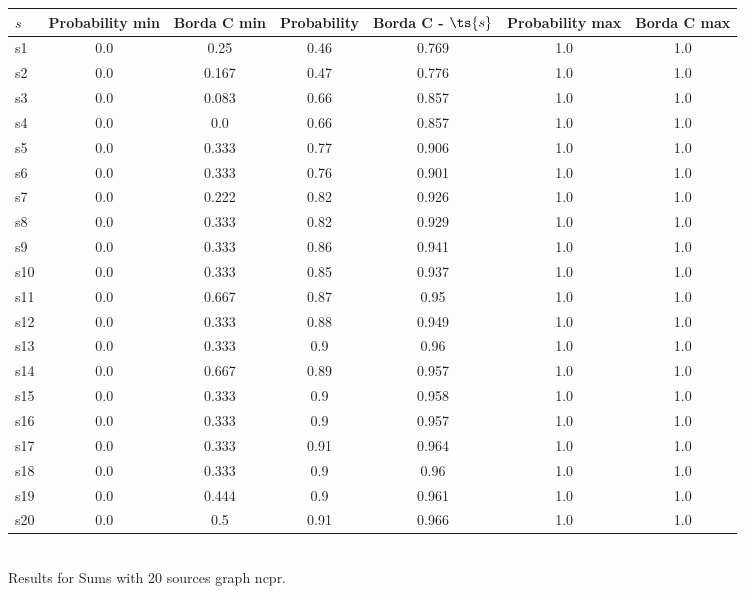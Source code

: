 \documentclass{article}
\begin{document}
\noindent\begin{tabular}{|l|c|c|c|c|c|c|}
\hline
$s$& Probability min & Borda C min & Probability & Borda C - $\ts{s}$ & Probability max & Borda C max\\
\hline
s1 &0.0 & 0.25 & 0.46 & 0.769 & 1.0 & 1.0\\
\hline
s2 &0.0 & 0.167 & 0.47 & 0.776 & 1.0 & 1.0\\
\hline
s3 &0.0 & 0.083 & 0.66 & 0.857 & 1.0 & 1.0\\
\hline
s4 &0.0 & 0.0 & 0.66 & 0.857 & 1.0 & 1.0\\
\hline
s5 &0.0 & 0.333 & 0.77 & 0.906 & 1.0 & 1.0\\
\hline
s6 &0.0 & 0.333 & 0.76 & 0.901 & 1.0 & 1.0\\
\hline
s7 &0.0 & 0.222 & 0.82 & 0.926 & 1.0 & 1.0\\
\hline
s8 &0.0 & 0.333 & 0.82 & 0.929 & 1.0 & 1.0\\
\hline
s9 &0.0 & 0.333 & 0.86 & 0.941 & 1.0 & 1.0\\
\hline
s10 &0.0 & 0.333 & 0.85 & 0.937 & 1.0 & 1.0\\
\hline
s11 &0.0 & 0.667 & 0.87 & 0.95 & 1.0 & 1.0\\
\hline
s12 &0.0 & 0.333 & 0.88 & 0.949 & 1.0 & 1.0\\
\hline
s13 &0.0 & 0.333 & 0.9 & 0.96 & 1.0 & 1.0\\
\hline
s14 &0.0 & 0.667 & 0.89 & 0.957 & 1.0 & 1.0\\
\hline
s15 &0.0 & 0.333 & 0.9 & 0.958 & 1.0 & 1.0\\
\hline
s16 &0.0 & 0.333 & 0.9 & 0.957 & 1.0 & 1.0\\
\hline
s17 &0.0 & 0.333 & 0.91 & 0.964 & 1.0 & 1.0\\
\hline
s18 &0.0 & 0.333 & 0.9 & 0.96 & 1.0 & 1.0\\
\hline
s19 &0.0 & 0.444 & 0.9 & 0.961 & 1.0 & 1.0\\
\hline
s20 &0.0 & 0.5 & 0.91 & 0.966 & 1.0 & 1.0\\
\hline
\end{tabular}\\

\noindent Results for Sums with 20 sources graph ncpr.
\end{document}
